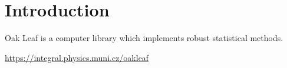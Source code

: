 \chapter{Introduction}

Oak Leaf is a computer library which implements robust statistical methods.


    \bigskip
    \url{https://integral.physics.muni.cz/oakleaf}
